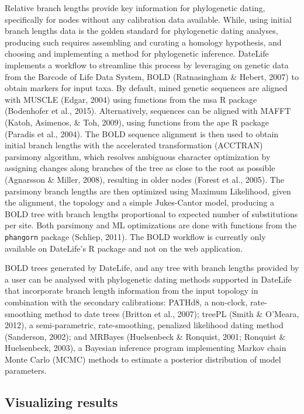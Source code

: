 \documentclass[english,man]{apa6}
\begin{document}
Relative branch lengths provide key information for phylogenetic dating, specifically for nodes without any calibration data available.
While, using initial branch lengths data is the golden standard for phylogenetic dating analyses, producing such requires assembling and curating a homology hypothesis, and choosing and implementing a method for phylogenetic inference.
DateLife implements a workflow to streamline this process by leveraging on genetic data from the Barcode of Life Data System, BOLD (Ratnasingham \& Hebert, 2007) to obtain markers for input taxa.
By default, mined genetic sequences are aligned with MUSCLE (Edgar, 2004) using functions from the msa R package (Bodenhofer et al., 2015). Alternatively, sequences can be aligned with MAFFT (Katoh, Asimenos, \& Toh, 2009), using functions from the ape R package (Paradis et al., 2004).
The BOLD sequence alignment is then used to obtain initial branch lengths with the accelerated transformation (ACCTRAN) parsimony algorithm, which resolves ambiguous character optimization by assigning changes along branches of the tree as close to the root as possible (Agnarsson \& Miller, 2008), resulting in older nodes (Forest et al., 2005). The parsimony branch lengths are then optimized using Maximum Likelihood, given the alignment, the topology and a simple Jukes-Cantor model, producing a BOLD tree with branch lengths proportional to expected number of substitutions per site. Both parsimony and ML optimizations are done with functions from the \texttt{phangorn} package (Schliep, 2011).
The BOLD workflow is currently only available on DateLife's R package and not on the web application.

BOLD trees generated by DateLife, and any tree with branch lengths provided by a user can be analysed with phylogenetic dating methods supported in DateLife that incorporate branch length information from the input topology in combination with the secondary calibrations:
PATHd8, a non-clock, rate-smoothing method to date trees (Britton et al., 2007);
treePL (Smith \& O'Meara, 2012), a semi-parametric, rate-smoothing, penalized likelihood dating method (Sanderson, 2002);
and MRBayes (Huelsenbeck \& Ronquist, 2001; Ronquist \& Huelsenbeck, 2003), a Bayesian inference program implementing Markov chain Monte Carlo (MCMC) methods to estimate a posterior distribution of model parameters.

\hypertarget{visualizing-results}{%
\subsection{Visualizing results}\label{visualizing-results}}
\end{document}
